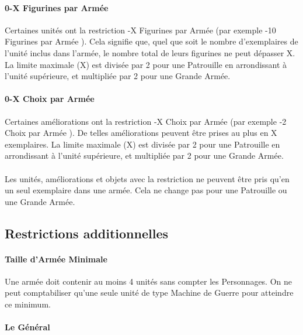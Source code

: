 \paragraph{0-X Figurines par Armée}

Certaines unités ont la restriction -X Figurines par Armée \fg{} (par exemple -10 Figurines par Armée \fg{}). Cela signifie que, quel que soit le nombre d'exemplaires de l'unité inclus dans l'armée, le nombre total de leurs figurines ne peut dépasser X. La limite maximale (X) est divisée par 2 pour une Patrouille en arrondissant à l'unité supérieure, et multipliée par 2 pour une Grande Armée.

\paragraph{0-X Choix par Armée}

Certaines améliorations ont la restriction -X Choix par Armée \fg{} (par exemple -2 Choix par Armée \fg{}). De telles améliorations peuvent être prises au plus en X exemplaires. La limite maximale (X) est divisée par 2 pour une Patrouille en arrondissant à l'unité supérieure, et multipliée par 2 pour une Grande Armée.

\paragraph{\oneperarmy}

Les unités, améliorations et objets avec la restriction \og \oneperarmy{} \fg{} ne peuvent être pris qu'en un seul exemplaire dans une armée. Cela ne change pas pour une Patrouille ou une Grande Armée.

\subsection{Restrictions additionnelles}

\paragraph{Taille d'Armée Minimale}

Une armée doit contenir au moins 4 unités sans compter les Personnages. On ne peut comptabiliser qu'une seule unité de type Machine de Guerre pour atteindre ce minimum.

\paragraph{Le Général}

